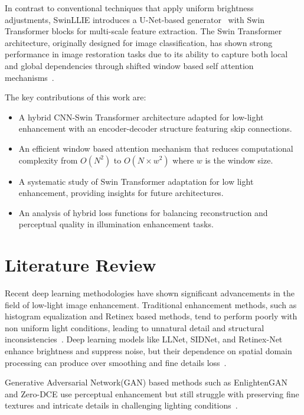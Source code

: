 \documentclass[conference]{IEEEtran}
\begin{document}
In contrast to conventional techniques that apply uniform brightness adjustments, SwinLLIE introduces a U-Net-based generator~\cite{ronneberger2015unet} with Swin Transformer blocks for multi-scale feature extraction. The Swin Transformer architecture, originally designed for image classification, has shown strong performance in image restoration tasks due to its ability to capture both local and global dependencies through shifted window based self attention mechanisms~\cite{liu2021swin, liang2021swinir}.

The key contributions of this work are:
\begin{itemize}
    \item A hybrid CNN-Swin Transformer architecture adapted for low-light enhancement with an encoder-decoder structure featuring skip connections.
    \item An efficient window based attention mechanism that reduces computational complexity from $O(N^2)$ to $O(N \times w^2)$ where $w$ is the window size.
    \item A systematic study of Swin Transformer adaptation for low light enhancement, providing insights for future architectures.
    \item An analysis of hybrid loss functions for balancing reconstruction and perceptual quality in illumination enhancement tasks.
\end{itemize}

\section{Literature Review}

Recent deep learning methodologies have shown significant advancements in the field of low-light image enhancement. Traditional enhancement methods, such as histogram equalization and Retinex based methods, tend to perform poorly with non uniform light conditions, leading to unnatural detail and structural inconsistencies~\cite{land1977retinex}. Deep learning models like LLNet, SIDNet, and Retinex-Net enhance brightness and suppress noise, but their dependence on spatial domain processing can produce over smoothing and fine details loss~\cite{lore2017llnet}.

Generative Adversarial Network(GAN) based methods such as EnlightenGAN and Zero-DCE use perceptual enhancement but still struggle with preserving fine textures and intricate details in challenging lighting conditions~\cite{jiang2021enlightengan, guo2020zero}.
\end{document}
